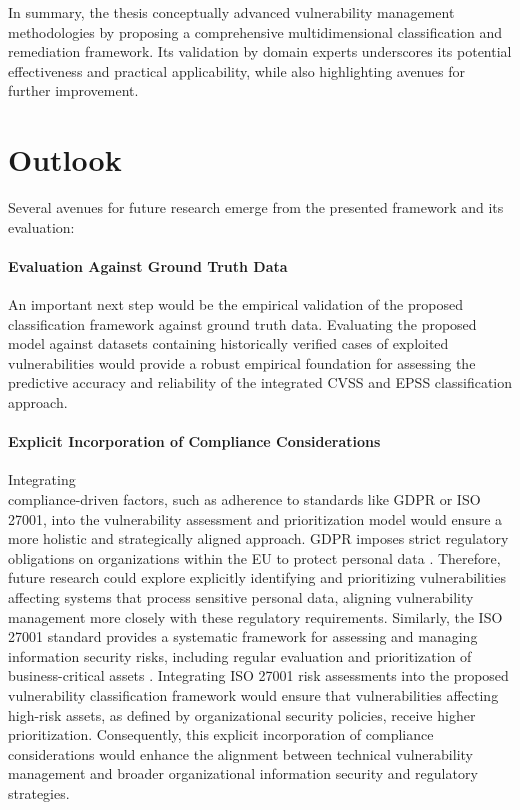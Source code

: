 In summary, the thesis conceptually advanced vulnerability management methodologies by proposing a comprehensive multidimensional classification and remediation framework. Its validation by domain experts underscores its potential effectiveness and practical applicability, while also highlighting avenues for further improvement.

\section{Outlook}
Several avenues for future research emerge from the presented framework and its evaluation:

\paragraph{Evaluation Against Ground Truth Data} An important next step would be the empirical validation of the proposed classification framework against ground truth data. Evaluating the proposed model against datasets containing historically verified cases of exploited vulnerabilities would provide a robust empirical foundation for assessing the predictive accuracy and reliability of the integrated \ac{CVSS} and \ac{EPSS} classification approach.

\paragraph{Explicit Incorporation of Compliance Considerations}
Integrating \\ compliance-driven factors, such as adherence to standards like \ac{GDPR} or ISO 27001, into the vulnerability assessment and prioritization model would ensure a more holistic and strategically aligned approach. \ac{GDPR} imposes strict regulatory obligations on organizations within the \ac{EU} to protect personal data \autocite{chassang_impact_2017}. Therefore, future research could explore explicitly identifying and prioritizing vulnerabilities affecting systems that process sensitive personal data, aligning vulnerability management more closely with these regulatory requirements. Similarly, the ISO 27001 standard provides a systematic framework for assessing and managing information security risks, including regular evaluation and prioritization of business-critical assets \autocite{international_organization_for_standardization_iso_isoiec_2018}. Integrating ISO 27001 risk assessments into the proposed vulnerability classification framework would ensure that vulnerabilities affecting high-risk assets, as defined by organizational security policies, receive higher prioritization. Consequently, this explicit incorporation of compliance considerations would enhance the alignment between technical vulnerability management and broader organizational information security and regulatory strategies.

